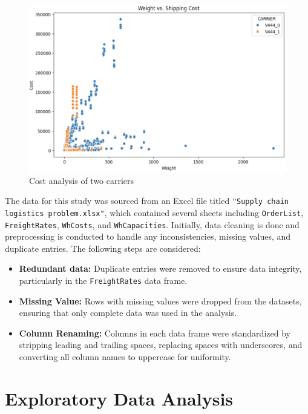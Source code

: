 \documentclass{article}
\begin{document}
\begin{figure}[!h]
     \begin{center}
     \includegraphics[width=0.6\paperwidth]{scatterplot.png}
     \end{center}
     \caption{Cost analysis of two carriers}
     \label{fig:cd}
\end{figure}


The data for this study was sourced from an Excel file titled \texttt{"Supply chain logistics problem.xlsx"}, which contained several sheets including \texttt{OrderList}, \texttt{FreightRates}, \texttt{WhCosts}, and \texttt{WhCapacities}. Initially, data cleaning is done and preprocessing is conducted to handle any inconsistencies, missing values, and duplicate entries. The following steps are considered:

\begin{itemize}
    \item \textbf{Redundant data:} Duplicate entries were removed to ensure data integrity, particularly in the \texttt{FreightRates} data frame.
    \item \textbf{Missing Value:} Rows with missing values were dropped from the datasets, ensuring that only complete data was used in the analysis.
    \item \textbf{Column Renaming:} Columns in each data frame were standardized by stripping leading and trailing spaces, replacing spaces with underscores, and converting all column names to uppercase for uniformity.
\end{itemize}

\section{Exploratory Data Analysis}
\end{document}
